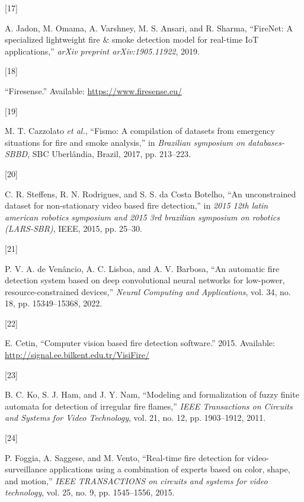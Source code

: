 \documentclass[
  10pt,
]{article}
\newlength{\cslhangindent}
\newlength{\csllabelwidth}
\newenvironment{CSLReferences}[2] %
 {\begin{list}{}{%
  \setlength{\itemindent}{0pt}
  \setlength{\leftmargin}{0pt}
  \setlength{\parsep}{0pt}
  \ifodd #1
   \setlength{\leftmargin}{\cslhangindent}
   \setlength{\itemindent}{-1\cslhangindent}
  \fi
  \setlength{\itemsep}{#2\baselineskip}}}
 {\end{list}}
\newcommand{\CSLLeftMargin}[1]{\parbox[t]{\csllabelwidth}{\strut#1\strut}}
\newcommand{\CSLRightInline}[1]{\parbox[t]{\linewidth - \csllabelwidth}{\strut#1\strut}}
\begin{document}
\begin{CSLReferences}{0}{0}
\CSLLeftMargin{{[}17{]} }%
\CSLRightInline{A. Jadon, M. Omama, A. Varshney, M. S. Ansari, and R.
Sharma, {``FireNet: A specialized lightweight fire \& smoke detection
model for real-time IoT applications,''} \emph{arXiv preprint
arXiv:1905.11922}, 2019.}

\CSLLeftMargin{{[}18{]} }%
\CSLRightInline{{``Firesense.''} Available:
\url{https://www.firesense.eu/}}

\CSLLeftMargin{{[}19{]} }%
\CSLRightInline{M. T. Cazzolato \emph{et al.}, {``Fismo: A compilation
of datasets from emergency situations for fire and smoke analysis,''} in
\emph{Brazilian symposium on databases-SBBD}, SBC Uberl{â}ndia, Brazil,
2017, pp. 213--223.}

\CSLLeftMargin{{[}20{]} }%
\CSLRightInline{C. R. Steffens, R. N. Rodrigues, and S. S. da Costa
Botelho, {``An unconstrained dataset for non-stationary video based fire
detection,''} in \emph{2015 12th latin american robotics symposium and
2015 3rd brazilian symposium on robotics (LARS-SBR)}, IEEE, 2015, pp.
25--30.}

\CSLLeftMargin{{[}21{]} }%
\CSLRightInline{P. V. A. de Venâncio, A. C. Lisboa, and A. V. Barbosa,
{``An automatic fire detection system based on deep convolutional neural
networks for low-power, resource-constrained devices,''} \emph{Neural
Computing and Applications}, vol. 34, no. 18, pp. 15349--15368, 2022.}

\CSLLeftMargin{{[}22{]} }%
\CSLRightInline{E. Cetin, {``Computer vision based fire detection
software.''} 2015. Available:
\url{http://signal.ee.bilkent.edu.tr/VisiFire/}}

\CSLLeftMargin{{[}23{]} }%
\CSLRightInline{B. C. Ko, S. J. Ham, and J. Y. Nam, {``Modeling and
formalization of fuzzy finite automata for detection of irregular fire
flames,''} \emph{IEEE Transactions on Circuits and Systems for Video
Technology}, vol. 21, no. 12, pp. 1903--1912, 2011.}

\CSLLeftMargin{{[}24{]} }%
\CSLRightInline{P. Foggia, A. Saggese, and M. Vento, {``Real-time fire
detection for video-surveillance applications using a combination of
experts based on color, shape, and motion,''} \emph{IEEE TRANSACTIONS on
circuits and systems for video technology}, vol. 25, no. 9, pp.
1545--1556, 2015.}


\end{CSLReferences}
\end{document}
